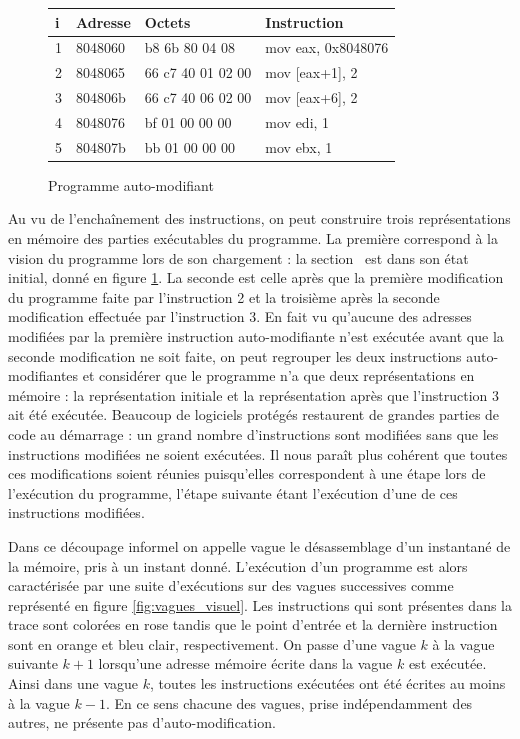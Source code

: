 \begin{figure}
\begin{center}
\begin{tabular}[b]{|l|l|l|l|}
\hline
i & Adresse & Octets & Instruction\\ 
\hline
1 & 8048060  &  b8 6b 80 04 08         &  mov    eax, 0x8048076\\
2 & 8048065  &  66 c7 40 01 02 00      &  mov    [eax+1], 2 \\
3 & 804806b  &  66 c7 40 06 02 00      &  mov    [eax+6], 2 \\
4 & 8048076  &  bf 01 00 00 00         &  mov    edi, 1 \\
5 & 804807b  &  bb 01 00 00 00         &  mov    ebx, 1 \\
\hline
\end{tabular}
\end{center}
\caption{Programme auto-modifiant}
\label{fig:prg_asm_sm}
\end{figure}


Au vu de l'enchaînement des instructions, on peut construire trois représentations en mémoire des parties exécutables du programme.
La première correspond à la vision du programme lors de son chargement : la section \ptext\ est dans son état initial, donné en figure \ref{fig:prg_asm_sm}.
La seconde est celle après que la première modification du programme faite par l'instruction 2 et la troisième après la seconde modification effectuée par l'instruction 3.
En fait vu qu'aucune des adresses modifiées par la première instruction auto-modifiante n'est exécutée avant que la seconde modification ne soit faite, on peut regrouper les deux instructions auto-modifiantes et considérer que le programme n'a que deux représentations en mémoire : la représentation initiale et la représentation après que l'instruction 3 ait été exécutée. 
Beaucoup de logiciels protégés restaurent de grandes parties de code au démarrage : un grand nombre d'instructions sont modifiées sans que les instructions modifiées ne soient exécutées. 
Il nous paraît plus cohérent que toutes ces modifications soient réunies puisqu'elles correspondent à une étape lors de l'exécution du programme, l'étape suivante étant l'exécution d'une de ces instructions modifiées.

Dans ce découpage informel on appelle vague le désassemblage d'un instantané de la mémoire, pris à un instant donné. 
L'exécution d'un programme est alors caractérisée par une suite d'exécutions sur des vagues successives comme représenté en figure \ref{fig:vagues_visuel}. Les instructions qui sont présentes dans la trace sont colorées en rose tandis que le point d'entrée et la dernière instruction sont en orange et bleu clair, respectivement.
On passe d'une vague $k$ à la vague suivante $k+1$ lorsqu'une adresse mémoire écrite dans la vague $k$ est exécutée.
Ainsi dans une vague $k$, toutes les instructions exécutées ont été écrites au moins à la vague $k-1$. 
En ce sens chacune des vagues, prise indépendamment des autres, ne présente pas d'auto-modification.

